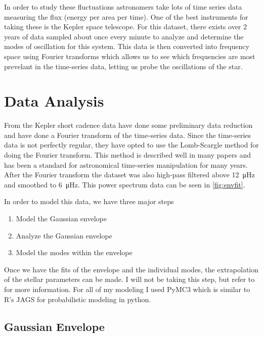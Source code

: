 \documentclass[
    aip,
    jmp,
    reprint,
    nofootinbib,
    floatfix
    ]{revtex4-1}
\begin{document}
        In order to study these fluctuations astronomers take lots of time series data measuring the flux (energy per area per time). One of the best instruments for taking these is the Kepler space telescope. For this dataset, there exists over 2 years of data sampled about once every minute to analyze and determine the modes of oscillation for this system. This data is then converted into frequency space using Fourier transforms which allows us to see which frequencies are most prevelant in the time-series data, letting us probe the oscillations of the star.


    \section{Data Analysis}

    From the Kepler short cadence data \citet{li} have done some preliminary data reduction and have done a Fourier transform of the time-series data. Since the time-series data is not perfectly regular, they have opted to use the Lomb-Scargle method for doing the Fourier transform. This method is described well in many papers and has been a standard for astronomical time-series manipulation for many years. After the Fourier transform the dataset was also high-pass filtered above \SI{12}{\micro Hz} and smoothed to \SI{6}{\micro Hz}. This power spectrum data can be seen in \autoref{fig:envfit}. 

    In order to model this data, we have three major steps
    \begin{enumerate}
        \item Model the Gaussian envelope
        \item Analyze the Gaussian envelope
        \item Model the modes within the envelope
    \end{enumerate}
    Once we have the fits of the envelope and the individual modes, the extrapolation of the stellar parameters can be made. I will not be taking this step, but refer to \citep{li} for more information. For all of my modeling I used PyMC3 \citep{pymc3} which is similar to R's JAGS for probabilistic modeling in python. 
    
    \subsection{Gaussian Envelope}
\end{document}
